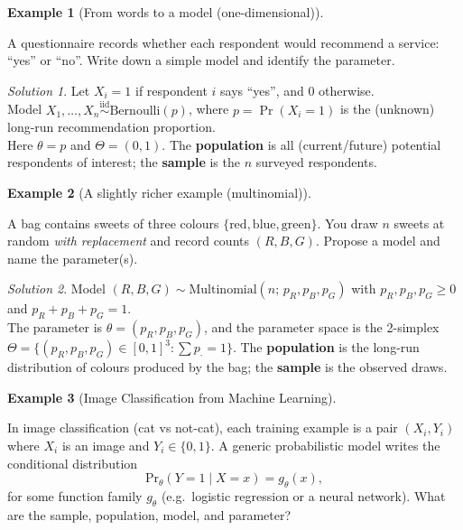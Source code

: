 \documentclass[
  letterpaper,
  DIV=11,
  numbers=noendperiod]{scrreprt}
\theoremstyle{definition}
\newtheorem{example}{Example}[chapter]
\theoremstyle{plain}
\theoremstyle{definition}
\theoremstyle{remark}
\newtheorem{refsolution}{Solution}[chapter]
\begin{document}
\begin{example}[From words to a model
(one-dimensional)]\protect\hypertarget{exm-identify-model}{}\label{exm-identify-model}

A questionnaire records whether each respondent would recommend a
service: ``yes'' or ``no''. Write down a simple model and identify the
parameter.

\end{example}

\begin{refsolution}
Let \(X_i=1\) if respondent \(i\) says ``yes'', and \(0\) otherwise.\\
Model
\(X_1,\ldots,X_n \stackrel{\text{iid}}{\sim}\mathrm{Bernoulli}(p)\),
where \(p=\Pr(X_i=1)\) is the (unknown) long-run recommendation
proportion.\\
Here \(\theta=p\) and \(\Theta=(0,1)\). The \textbf{population} is all
(current/future) potential respondents of interest; the \textbf{sample}
is the \(n\) surveyed respondents.

\label{sol-identify-model}

\end{refsolution}

\begin{example}[A slightly richer example
(multinomial)]\protect\hypertarget{exm-identify-model-multinomial}{}\label{exm-identify-model-multinomial}

A bag contains sweets of three colours
\(\{\text{red},\text{blue},\text{green}\}\). You draw \(n\) sweets at
random \emph{with replacement} and record counts \((R,B,G)\). Propose a
model and name the parameter(s).

\end{example}

\begin{refsolution}
Model
\((R,B,G) \sim \mathrm{Multinomial}\!\left(n;\,p_R,p_B,p_G\right)\) with
\(p_R,p_B,p_G\ge 0\) and \(p_R+p_B+p_G=1\).\\
The parameter is \(\theta=(p_R,p_B,p_G)\), and the parameter space is
the 2-simplex \(\Theta=\{(p_R,p_B,p_G)\in[0,1]^3:\sum p_\cdot=1\}\). The
\textbf{population} is the long-run distribution of colours produced by
the bag; the \textbf{sample} is the observed draws.

\label{sol-identify-model-multinomial}

\end{refsolution}

\begin{example}[Image Classification from Machine
Learning]\protect\hypertarget{exm-ml-inference}{}\label{exm-ml-inference}

In image classification (cat vs not-cat), each training example is a
pair \((X_i,Y_i)\) where \(X_i\) is an image and \(Y_i\in\{0,1\}\). A
generic probabilistic model writes the conditional distribution \[
\mathrm{Pr}_\theta(Y=1\mid X=x)=g_\theta(x),
\] for some function family \(g_\theta\) (e.g.~logistic regression or a
neural network). What are the sample, population, model, and parameter?

\end{example}
\end{document}
